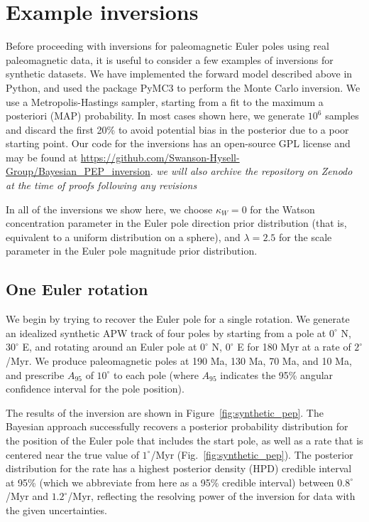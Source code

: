 \documentclass[11pt,letterpaper]{article}
\begin{document}
\section*{Example inversions}
\label{sec:example_inversion}

Before proceeding with inversions for paleomagnetic Euler poles using real paleomagnetic data, it is useful to consider a few examples of inversions for synthetic datasets. We have implemented the forward model described above in Python, and used the package PyMC3 \citep{Salvatier2016a} to perform the Monte Carlo inversion. We use a Metropolis-Hastings sampler, starting from a fit to the maximum a posteriori (MAP) probability. In most cases shown here, we generate $10^6$ samples and discard the first 20\% to avoid potential bias in the posterior due to a poor starting point. Our code for the inversions has an open-source GPL license and may be found at \url{https://github.com/Swanson-Hysell-Group/Bayesian_PEP_inversion}. \textit{we will also archive the repository on Zenodo at the time of proofs following any revisions}

In all of the inversions we show here, we choose $\kappa_W=0$ for the Watson concentration parameter in the Euler pole direction prior distribution (that is, equivalent to a uniform distribution on a sphere), and $\lambda=2.5$ for the scale parameter in the Euler pole magnitude prior distribution.

\subsection*{One Euler rotation}
\label{sec:one_stage_pole}
We begin by trying to recover the Euler pole for a single rotation. We generate an idealized synthetic APW track of four poles by starting from a pole at $0^\circ$ N, $30^\circ$ E, and rotating around an Euler pole at $0^\circ$ N, $0^\circ$ E for 180 Myr at a rate of $2^\circ$/Myr.
We produce paleomagnetic poles at 190 Ma, 130 Ma, 70 Ma, and 10 Ma, and prescribe $A_{95}$
of $10^\circ$ to each pole (where $A_{95}$ indicates the 95\% angular confidence interval for the pole position).

The results of the inversion are shown in Figure~\ref{fig:synthetic_pep}. The Bayesian approach successfully recovers a posterior probability distribution for the position of the Euler pole that includes the start pole, as well as a rate that is centered near the true value of $1^\circ$/Myr (Fig.~\ref{fig:synthetic_pep}). The posterior distribution for the rate has a highest posterior density (HPD) credible interval at 95\% 
(which we abbreviate from here as a 95\% credible interval)
between $0.8^\circ$/Myr and $1.2^\circ$/Myr, reflecting the resolving power of the inversion for data with the given uncertainties.
\end{document}
